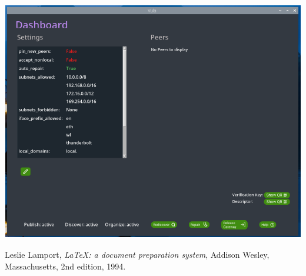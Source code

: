 \documentclass[
	trilingual,
	type=projectproposal,
	twocolumn
]{bfhpub}
\begin{document}
\includegraphics[width=\linewidth]{pictures/dashboard.png}
\par\nointerlineskip\bfhRule
 
\newpage
\begin{thebibliography}{9}
	Leslie Lamport,
	\textit{\LaTeX: a document preparation system},
	Addison Wesley, Massachusetts,
	2nd edition,
	1994.
\end{thebibliography}
 
\vfill
{}
 
\end{document}
